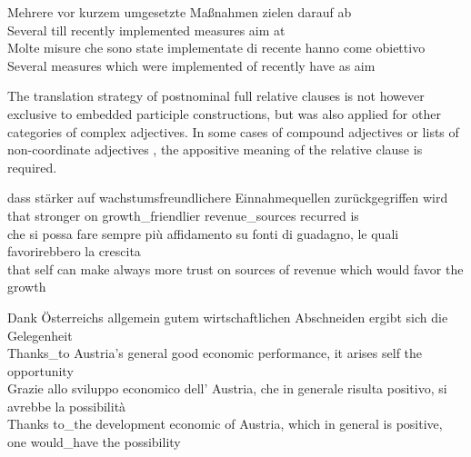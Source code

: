 \documentclass[output=paper,colorlinks,citecolor=brown]{langscibook}
\begin{document}
\ea%
    \label{ex:resi:40}
\ea \gll Mehrere  vor  kurzem  umgesetzte  Maßnahmen  zielen  darauf  ab \\
   Several  till recently  implemented  measures  aim  at      \\


\ex \gll Molte     misure  che       {sono state}  implementate  di recente  hanno  come   obiettivo\\
   Several  measures  which  were       implemented  of recently  have  as   aim\\
    \z
\z

The translation strategy of postnominal full relative clauses is not however exclusive to embedded participle constructions, but was also applied for other categories of complex adjectives. In some cases of compound adjectives  or lists of non-coordinate adjectives , the appositive meaning of the relative clause is required.

\ea%
    \label{ex:resi:41}
\ea \gll dass  stärker  auf  wachstumsfreundlichere  Einnahmequellen  zurückgegriffen  wird \\
   that  stronger  on  growth\_friendlier  revenue\_sources  recurred  is  \\


\ex \gll che  si  possa  fare  sempre più  affidamento  su  fonti  di guadagno,    le quali  favorirebbero  la  crescita            \\
   that  self  can    make always more trust  on  sources  of revenue    which  would favor  the  growth    \\
    \z
\z





\ea%
    \label{ex:resi:42}
\ea \gll Dank  Österreichs  allgemein  gutem  wirtschaftlichen  Abschneiden   ergibt sich  die  Gelegenheit    \\
 Thanks\_to  Austria’s  general    good  economic        performance,    it arises self the  opportunity        \\


\ex \gll Grazie  allo  sviluppo  economico  dell’  Austria,  che  in generale     risulta  positivo,  si  avrebbe  la  possibilità       \\
   Thanks  to\_the  development  economic  of   Austria,  which in general      is  positive,     one  would\_have  the  possibility      \\
\end{document}
